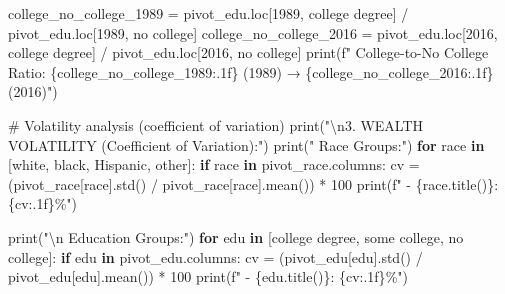 \documentclass[
  letterpaper,
  DIV=11,
  numbers=noendperiod]{scrartcl}
\newenvironment{Shaded}{\begin{snugshade}}{\end{snugshade}}
\newcommand{\BuiltInTok}[1]{\textcolor[rgb]{0.00,0.23,0.31}{#1}}
\newcommand{\CharTok}[1]{\textcolor[rgb]{0.13,0.47,0.30}{#1}}
\newcommand{\CommentTok}[1]{\textcolor[rgb]{0.37,0.37,0.37}{#1}}
\newcommand{\ControlFlowTok}[1]{\textcolor[rgb]{0.00,0.23,0.31}{\textbf{#1}}}
\newcommand{\DecValTok}[1]{\textcolor[rgb]{0.68,0.00,0.00}{#1}}
\newcommand{\KeywordTok}[1]{\textcolor[rgb]{0.00,0.23,0.31}{\textbf{#1}}}
\newcommand{\NormalTok}[1]{\textcolor[rgb]{0.00,0.23,0.31}{#1}}
\newcommand{\OperatorTok}[1]{\textcolor[rgb]{0.37,0.37,0.37}{#1}}
\newcommand{\SpecialCharTok}[1]{\textcolor[rgb]{0.37,0.37,0.37}{#1}}
\newcommand{\SpecialStringTok}[1]{\textcolor[rgb]{0.13,0.47,0.30}{#1}}
\newcommand{\StringTok}[1]{\textcolor[rgb]{0.13,0.47,0.30}{#1}}
\begin{document}
\begin{Shaded}
\begin{Highlighting}[]
\NormalTok{college\_no\_college\_1989 }\OperatorTok{=}\NormalTok{ pivot\_edu.loc[}\DecValTok{1989}\NormalTok{, }\StringTok{\textquotesingle{}college degree\textquotesingle{}}\NormalTok{] }\OperatorTok{/}\NormalTok{ pivot\_edu.loc[}\DecValTok{1989}\NormalTok{, }\StringTok{\textquotesingle{}no college\textquotesingle{}}\NormalTok{]}
\NormalTok{college\_no\_college\_2016 }\OperatorTok{=}\NormalTok{ pivot\_edu.loc[}\DecValTok{2016}\NormalTok{, }\StringTok{\textquotesingle{}college degree\textquotesingle{}}\NormalTok{] }\OperatorTok{/}\NormalTok{ pivot\_edu.loc[}\DecValTok{2016}\NormalTok{, }\StringTok{\textquotesingle{}no college\textquotesingle{}}\NormalTok{]}
\BuiltInTok{print}\NormalTok{(}\SpecialStringTok{f"   College{-}to{-}No College Ratio: }\SpecialCharTok{\{}\NormalTok{college\_no\_college\_1989}\SpecialCharTok{:.1f\}}\SpecialStringTok{ (1989) → }\SpecialCharTok{\{}\NormalTok{college\_no\_college\_2016}\SpecialCharTok{:.1f\}}\SpecialStringTok{ (2016)"}\NormalTok{)}

\CommentTok{\# Volatility analysis (coefficient of variation)}
\BuiltInTok{print}\NormalTok{(}\StringTok{"}\CharTok{\textbackslash{}n}\StringTok{3. WEALTH VOLATILITY (Coefficient of Variation):"}\NormalTok{)}
\BuiltInTok{print}\NormalTok{(}\StringTok{"   Race Groups:"}\NormalTok{)}
\ControlFlowTok{for}\NormalTok{ race }\KeywordTok{in}\NormalTok{ [}\StringTok{\textquotesingle{}white\textquotesingle{}}\NormalTok{, }\StringTok{\textquotesingle{}black\textquotesingle{}}\NormalTok{, }\StringTok{\textquotesingle{}Hispanic\textquotesingle{}}\NormalTok{, }\StringTok{\textquotesingle{}other\textquotesingle{}}\NormalTok{]:}
    \ControlFlowTok{if}\NormalTok{ race }\KeywordTok{in}\NormalTok{ pivot\_race.columns:}
\NormalTok{        cv }\OperatorTok{=}\NormalTok{ (pivot\_race[race].std() }\OperatorTok{/}\NormalTok{ pivot\_race[race].mean()) }\OperatorTok{*} \DecValTok{100}
        \BuiltInTok{print}\NormalTok{(}\SpecialStringTok{f"   {-} }\SpecialCharTok{\{}\NormalTok{race}\SpecialCharTok{.}\NormalTok{title()}\SpecialCharTok{\}}\SpecialStringTok{: }\SpecialCharTok{\{}\NormalTok{cv}\SpecialCharTok{:.1f\}}\SpecialStringTok{\%"}\NormalTok{)}

\BuiltInTok{print}\NormalTok{(}\StringTok{"}\CharTok{\textbackslash{}n}\StringTok{   Education Groups:"}\NormalTok{)}
\ControlFlowTok{for}\NormalTok{ edu }\KeywordTok{in}\NormalTok{ [}\StringTok{\textquotesingle{}college degree\textquotesingle{}}\NormalTok{, }\StringTok{\textquotesingle{}some college\textquotesingle{}}\NormalTok{, }\StringTok{\textquotesingle{}no college\textquotesingle{}}\NormalTok{]:}
    \ControlFlowTok{if}\NormalTok{ edu }\KeywordTok{in}\NormalTok{ pivot\_edu.columns:}
\NormalTok{        cv }\OperatorTok{=}\NormalTok{ (pivot\_edu[edu].std() }\OperatorTok{/}\NormalTok{ pivot\_edu[edu].mean()) }\OperatorTok{*} \DecValTok{100}
        \BuiltInTok{print}\NormalTok{(}\SpecialStringTok{f"   {-} }\SpecialCharTok{\{}\NormalTok{edu}\SpecialCharTok{.}\NormalTok{title()}\SpecialCharTok{\}}\SpecialStringTok{: }\SpecialCharTok{\{}\NormalTok{cv}\SpecialCharTok{:.1f\}}\SpecialStringTok{\%"}\NormalTok{)}


\end{Highlighting}
\end{Shaded}
\end{document}
